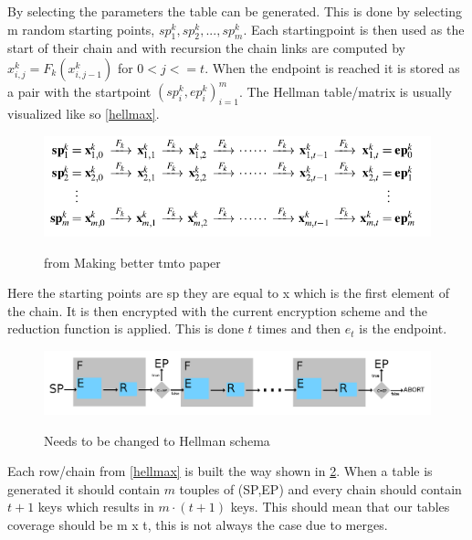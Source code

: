 By selecting the parameters the table can be generated. This is done by selecting m random starting points, $ sp^{k}_1,sp^{k}_2,...,sp^{k}_m$. Each startingpoint is then used as the start of their chain and with recursion the chain links are computed by $ x^{k}_{i,j}=F_k( x^{k}_{i,j-1})$ for $0<j<=t$. When the endpoint is reached it is stored as a pair with the startpoint ${( sp^{k}_{i}, ep^{k}_{i})}^{m}_{i=1}$.
The Hellman table/matrix is usually visualized like so \ref{hellmax}.
\\
\begin{figure}[th]
  \caption{from Making better tmto paper}
  \includegraphics[width=\textwidth]{figures/HellmanMatrix.png}
  \centering
  \label{fig:hellmax}
\end{figure}

Here the starting points are sp they are equal to x which is the first element of the chain. It is then encrypted with the current encryption scheme and the reduction function is applied. This is done $t$ times and then $e_t$ is the endpoint.

\begin{figure}[th]
  \caption{Needs to be changed to Hellman schema}
  \includegraphics[width=\textwidth]{figures/DPSchema.png}
  \centering
  \label{fig:hellSchema}
\end{figure}

Each row/chain from \ref{hellmax} is built the way shown in \ref{fig:hellSchema}. When a table is generated it should contain $m$ touples of (SP,EP) and every chain should contain $t+1$ keys which results in $m\cdot(t+1)$ keys. This should mean that our tables coverage should be m x t, this is not always the case due to merges.

